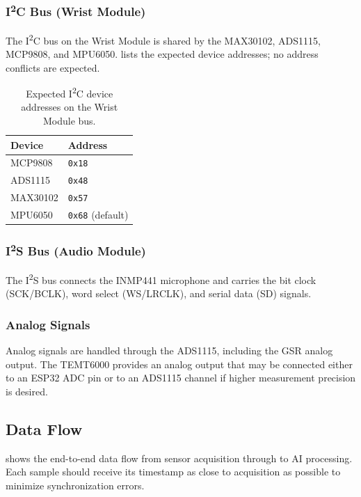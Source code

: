 \subsubsection{I\texorpdfstring{\textsuperscript{2}}{2}C Bus (Wrist Module)}
The I\textsuperscript{2}C bus on the Wrist Module is shared by the MAX30102, ADS1115, MCP9808, and MPU6050.  lists the expected device addresses; no address conflicts are expected.

\begin{table}[H]
\centering
\caption{Expected I\textsuperscript{2}C device addresses on the Wrist Module bus.}
\label{tab:i2c-addresses}
\small
\begin{tabularx}{\columnwidth}{@{}Y l@{}}
\toprule
\textbf{Device} & \textbf{Address} \\
\midrule
MCP9808 & \texttt{0x18} \\
ADS1115 & \texttt{0x48} \\
MAX30102 & \texttt{0x57} \\
MPU6050 & \texttt{0x68} (default) \\
\bottomrule
\end{tabularx}
\end{table}

\subsubsection{I\texorpdfstring{\textsuperscript{2}}{2}S Bus (Audio Module)}
The I\textsuperscript{2}S bus connects the INMP441 microphone and carries the bit clock (SCK/BCLK), word select (WS/LRCLK), and serial data (SD) signals.

\subsubsection{Analog Signals}
Analog signals are handled through the ADS1115, including the GSR analog output. The TEMT6000 provides an analog output that may be connected either to an ESP32 ADC pin or to an ADS1115 channel if higher measurement precision is desired.

\subsection{Data Flow}
\label{sec:data-flow}

 shows the end-to-end data flow from sensor acquisition through to AI processing. Each sample should receive its timestamp as close to acquisition as possible to minimize synchronization errors.

